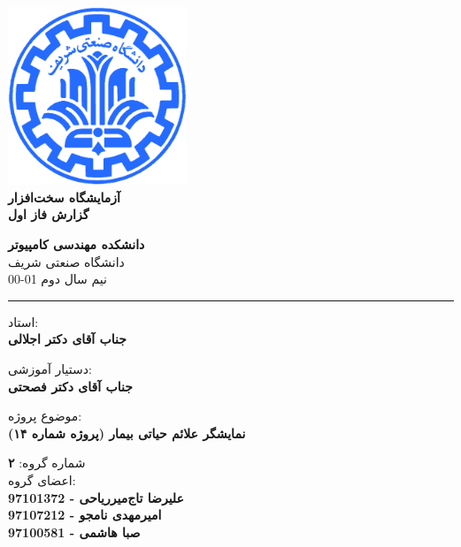 \documentclass[12pt]{article}
\begin{document}
\begin{titlepage}
\begin{center}
        
\vspace*{0.7cm}

\includegraphics[width=0.4\textwidth]{sharif1.png}\\
\vspace{0.5cm}
\textbf{ \Huge{\emph ‌آزمایشگاه سخت‌افزار} }\\
\vspace{0.5cm}
\textbf{ \Large{گزارش فاز اول} }
\vspace{0.2cm}
       
 
      \large \textbf{دانشکده مهندسی کامپیوتر}\\\vspace{0.2cm}
    \large   دانشگاه صنعتی شریف\\\vspace{0.2cm}
       \large   ﻧﯿﻢ سال دوم 01-00 \\\vspace{0.2cm}
      \noindent\rule[1ex]{\linewidth}{1pt}
استاد:\\
    \textbf{{جناب آقای دکتر اجلالی}}


دستیار آموزشی:\\
\textbf{{جناب آقای دکتر فصحتی}}

    \vspace{0.25cm}
    
    موضوع پروژه:\\
    
    \textbf{{نمایشگر علائم حیاتی بیمار (پروژه شماره ۱۴)}}
    
    \vspace{0.35cm}
    
    
        شماره گروه:
    \textbf{{۲}}\\
    
اعضای گروه:\\

    \textbf{{علیرضا تاج‌میرریاحی - 97101372}}
    \\
   
     \textbf{{امیرمهدی نامجو - 97107212}}   
   \\
   
    \textbf{{ صبا هاشمی - 97100581}}
\end{center}
\end{titlepage}
\end{document}
